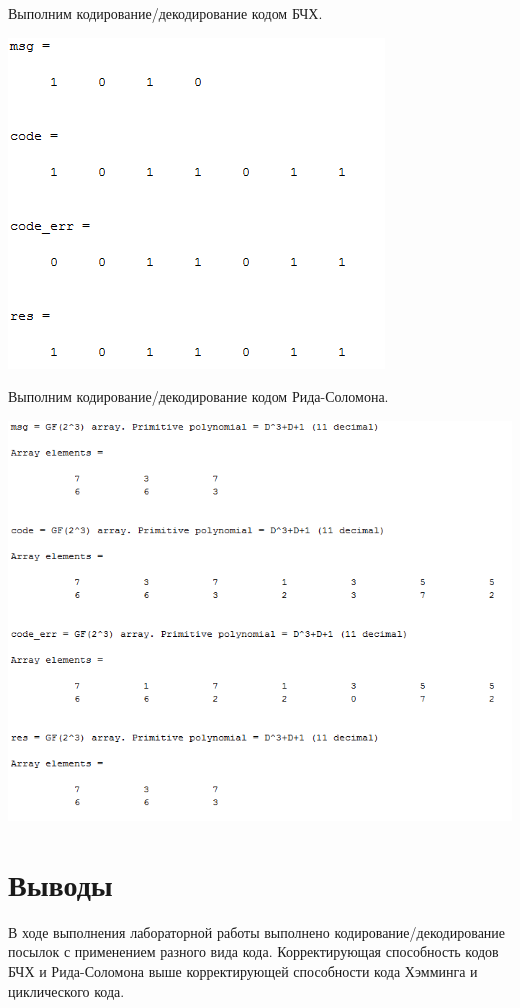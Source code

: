 \documentclass[a4paper]{article}
\begin{document}
Выполним кодирование/декодирование кодом БЧХ.


\includegraphics[scale = 0.7]{res4.png}

Выполним кодирование/декодирование кодом Рида-Соломона.


\includegraphics[scale = 0.7]{res5.png}

\section{Выводы}
В ходе выполнения лабораторной работы выполнено кодирование/декодирование посылок с применением разного вида кода. Корректирующая способность кодов БЧХ и Рида-Соломона выше корректирующей способности кода Хэмминга и циклического кода.
\end{document}
